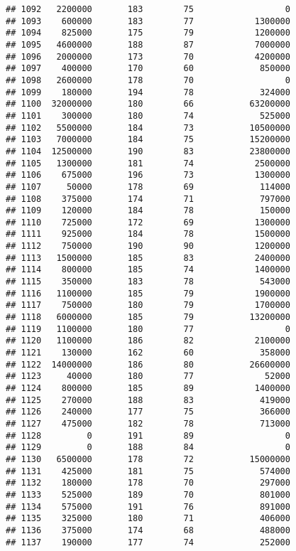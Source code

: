 \documentclass[
]{article}
\begin{document}
\begin{verbatim}
## 1092   2200000       183        75                  0
## 1093    600000       183        77            1300000
## 1094    825000       175        79            1200000
## 1095   4600000       188        87            7000000
## 1096   2000000       173        70            4200000
## 1097    400000       170        60             850000
## 1098   2600000       178        70                  0
## 1099    180000       194        78             324000
## 1100  32000000       180        66           63200000
## 1101    300000       180        74             525000
## 1102   5500000       184        73           10500000
## 1103   7000000       184        75           15200000
## 1104  12500000       190        83           23800000
## 1105   1300000       181        74            2500000
## 1106    675000       196        73            1300000
## 1107     50000       178        69             114000
## 1108    375000       174        71             797000
## 1109    120000       184        78             150000
## 1110    725000       172        69            1300000
## 1111    925000       184        78            1500000
## 1112    750000       190        90            1200000
## 1113   1500000       185        83            2400000
## 1114    800000       185        74            1400000
## 1115    350000       183        78             543000
## 1116   1100000       185        79            1900000
## 1117    750000       180        79            1700000
## 1118   6000000       185        79           13200000
## 1119   1100000       180        77                  0
## 1120   1100000       186        82            2100000
## 1121    130000       162        60             358000
## 1122  14000000       186        80           26600000
## 1123     40000       180        77              52000
## 1124    800000       185        89            1400000
## 1125    270000       188        83             419000
## 1126    240000       177        75             366000
## 1127    475000       182        78             713000
## 1128         0       191        89                  0
## 1129         0       188        84                  0
## 1130   6500000       178        72           15000000
## 1131    425000       181        75             574000
## 1132    180000       178        70             297000
## 1133    525000       189        70             801000
## 1134    575000       191        76             891000
## 1135    325000       180        71             406000
## 1136    375000       174        68             488000
## 1137    190000       177        74             252000

\end{verbatim}
\end{document}
